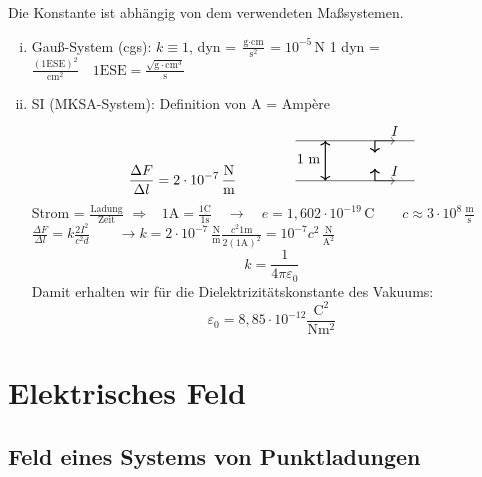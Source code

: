 \documentclass[titlepage,11pt,a4paper,ngerman]{report}
\newcommand{\tx}[1]{\textrm{#1}}
\renewcommand{\epsilon}{\varepsilon}
\begin{document}
Die Konstante ist abhängig von dem verwendeten Maßsystemen.
\begin{enumerate}[i)]
	\item Gauß-System (cgs): $k \equiv 1$, dyn = $\frac{\textrm{g}\cdot \textrm{cm}}{\textrm{s}^2} = 10^{-5}\,\textrm{N}$
	1 dyn = $\frac{(1\textrm{ESE})^2}{\textrm{cm}^2} \quad 1\textrm{ESE} = \frac{\sqrt{\textrm{g}\cdot \textrm{cm}^3}}{\textrm{s}}$
	\item SI (MKSA-System): Definition von A = Amp\`ere 
	\vspace{-15pt}
	$$\frac{\Delta F}{\Delta l}= 2 \cdot 10^{-7}\,\frac{\textrm{N}}{\textrm{m}} \qquad \qquad \begin{tikzpicture}
	\draw (0,0) -- (3,0);
	\draw (0,1) -- (3,1);
	\draw[thick,<->] (.75,0) -- (.75,1) node[anchor=north east,yshift=-6pt] {1 m};
	\draw[thick,->] (2,0) -- (2,.3);
	\draw[thick,->] (2,1) -- (2,.7);
	\draw[->] (2,0) -- (2.5,0) node[above] {$ I $};
	\draw[->] (2,1) -- (2.5,1) node[above] {$ I $};
	\end{tikzpicture}$$
	Strom = $\frac{\textrm{Ladung}}{\textrm{Zeit}}$ $\Rightarrow$  \ 
	$
	1 \tx{A} = \frac{1 \tx{C}}{1 \tx{s}} \quad \rightarrow \quad e = 1{,}602 \cdot 10^{-19} \, \tx{C} \qquad c \approx 3 \cdot 10^{8} \, \frac{\tx{m}}{\tx{s}}
	$\\[5pt]
	$
	\frac{\Delta F}{\Delta l} = k \frac{2 I^2}{c^2 d} \qquad \rightarrow k = 2 \cdot 10^{-7} \ \frac{\tx{N}}{\tx{m}} \frac{c^2 1 \tx{m}}{2 (1 \tx{A})^2} = 10^{-7} c^2 \, \frac{\tx{N}}{\tx{A}^2}
	$
	\begin{equation*}
	k = \frac{1}{4 \pi \epsilon_0}
	\end{equation*}
	Damit erhalten wir für die Dielektrizitätskonstante des Vakuums:
	\begin{equation*}
	\epsilon_0 = 8{,}85 \cdot 10^{-12} \frac{\tx{C}^2}{\tx{N} \tx{m}^2}
	\end{equation*}
\end{enumerate}

\section{Elektrisches Feld}
\subsection{Feld eines Systems von Punktladungen}
\end{document}
